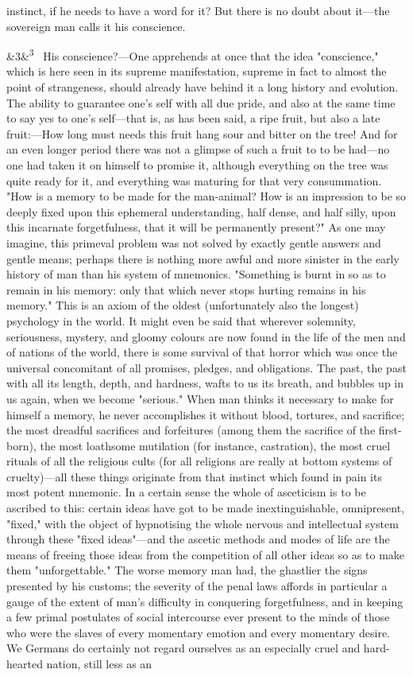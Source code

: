 \documentclass[12pt]{article}
\newcommand{\para}[1][]{\par\noindent\ifx&#1&\else\textsuperscript{\footnotesize #1}~\fi}
\begin{document}
instinct, if he needs to have a word for it? But there is no doubt about it---the sovereign man calls it his conscience.

\para[3] His conscience?---One apprehends at once that the idea "conscience," which is here seen in its supreme manifestation, supreme in fact to almost the point of strangeness, should already have behind it a long history and evolution. The ability to guarantee one's self with all due pride, and also at the same time to say yes to one's self---that is, as has been said, a ripe fruit, but also a late fruit:---How long must needs this fruit hang sour and bitter on the tree! And for an even longer period there was not a glimpse of such a fruit to to be had---no one had taken it on himself to promise it, although everything on the tree was quite ready for it, and everything was maturing for that very consummation. "How is a memory to be made for the man-animal? How is an impression to be so deeply fixed upon this ephemeral understanding, half dense, and half silly, upon this incarnate forgetfulness, that it will be permanently present?" As one may imagine, this primeval problem was not solved by exactly gentle answers and gentle means; perhaps there is nothing more awful and more sinister in the early history of man than his system of mnemonics. "Something is burnt in so as to remain in his memory: only that which never stops hurting remains in his memory." This is an axiom of the oldest (unfortunately also the longest) psychology in the world. It might even be said that wherever solemnity, seriousness, mystery, and gloomy colours are now found in the life of the men and of nations of the world, there is some survival of that horror which was once the universal concomitant of all promises, pledges, and obligations. The past, the past with all its length, depth, and hardness, wafts to us its breath, and bubbles up in us again, when we become "serious." When man thinks it necessary to make for himself a memory, he never accomplishes it without blood, tortures, and sacrifice; the most dreadful sacrifices and forfeitures (among them the sacrifice of the first-born), the most loathsome mutilation (for instance, castration), the most cruel rituals of all the religious cults (for all religions are really at bottom systems of cruelty)---all these things originate from that instinct which found in pain its most potent mnemonic. In a certain sense the whole of asceticism is to be ascribed to this: certain ideas have got to be made inextinguishable, omnipresent, "fixed," with the object of hypnotising the whole nervous and intellectual system through these "fixed ideas"---and the ascetic methods and modes of life are the means of freeing those ideas from the competition of all other ideas so as to make them "unforgettable." The worse memory man had, the ghastlier the signs presented by his customs; the severity of the penal laws affords in particular a gauge of the extent of man's difficulty in conquering forgetfulness, and in keeping a few primal postulates of social intercourse ever present to the minds of those who were the slaves of every momentary emotion and every momentary desire. We Germans do certainly not regard ourselves as an especially cruel and hard-hearted nation, still less as an 
\end{document}
